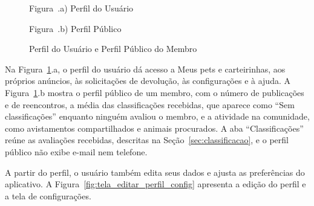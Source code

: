 \begin{figure}[H]
    \centering
    \caption{Perfil do Usuário e Perfil Público do Membro}
    \label{fig:tela_perfil}
    \vspace{0.15cm}
    \begin{minipage}[t]{0.48\textwidth}
        \centering
        \par\vspace{0.12cm}
        {\small Figura~\thefigure.a) Perfil do Usuário}
    \end{minipage}
    \hfill
    \begin{minipage}[t]{0.48\textwidth}
        \centering
        \par\vspace{0.12cm}
        {\small Figura~\thefigure.b) Perfil Público}
    \end{minipage}
    \par\vspace{0.12cm}
\end{figure}

Na Figura~\ref{fig:tela_perfil}.a, o perfil do usuário dá acesso a Meus pets e carteirinhas, aos próprios anúncios, às solicitações de devolução, às configurações e à ajuda. A Figura~\ref{fig:tela_perfil}.b mostra o perfil público de um membro, com o número de publicações e de reencontros, a média das classificações recebidas, que aparece como ``Sem classificações'' enquanto ninguém avaliou o membro, e a atividade na comunidade, como avistamentos compartilhados e animais procurados. A aba ``Classificações'' reúne as avaliações recebidas, descritas na Seção~\ref{sec:classificacao}, e o perfil público não exibe e-mail nem telefone.

A partir do perfil, o usuário também edita seus dados e ajusta as preferências do aplicativo. A Figura~\ref{fig:tela_editar_perfil_config} apresenta a edição do perfil e a tela de configurações.

